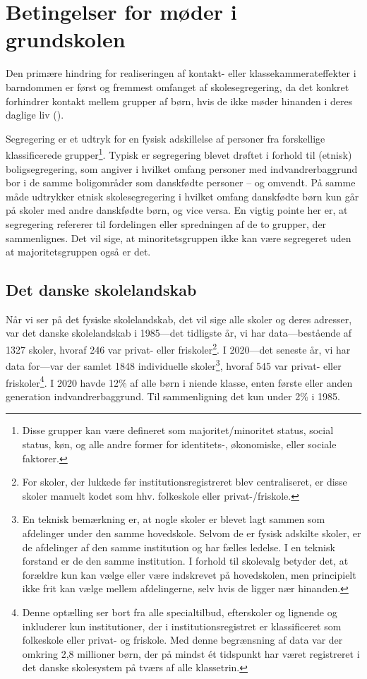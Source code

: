 \documentclass[
]{book}
\begin{document}
\section{Betingelser for møder i grundskolen}\label{betingelser-for-muxf8der-i-grundskolen}

Den primære hindring for realiseringen af kontakt- eller klassekammerateffekter i barndommen er først og fremmest omfanget af skolesegregering, da det konkret forhindrer kontakt mellem grupper af børn, hvis de ikke møder hinanden i deres daglige liv ().

Segregering er et udtryk for en fysisk adskillelse af personer fra forskellige klassificerede grupper\footnote{Disse grupper kan være defineret som majoritet/minoritet status, social status, køn, og alle andre former for identitets-, økonomiske, eller sociale faktorer.}. Typisk er segregering blevet drøftet i forhold til (etnisk) boligsegregering, som angiver i hvilket omfang personer med indvandrerbaggrund bor i de samme boligområder som danskfødte personer -- og omvendt. På samme måde udtrykker etnisk skolesegregering i hvilket omfang danskfødte børn kun går på skoler med andre danskfødte børn, og vice versa. En vigtig pointe her er, at segregering refererer til fordelingen eller spredningen af de to grupper, der sammenlignes. Det vil sige, at minoritetsgruppen ikke kan være segregeret uden at majoritetsgruppen også er det.

\subsection{Det danske skolelandskab}\label{det-danske-skolelandskab}

Når vi ser på det fysiske skolelandskab, det vil sige alle skoler og deres adresser, var det danske skolelandskab i 1985---det tidligste år, vi har data---bestående af 1327 skoler, hvoraf 246 var privat- eller friskoler\footnote{For skoler, der lukkede før institutionsregistreret blev centraliseret, er disse skoler manuelt kodet som hhv. folkeskole eller privat-/friskole.}. I 2020---det seneste år, vi har data for---var der samlet 1848 individuelle skoler\footnote{En teknisk bemærkning er, at nogle skoler er blevet lagt sammen som afdelinger under den samme hovedskole. Selvom de er fysisk adskilte skoler, er de afdelinger af den samme institution og har fælles ledelse. I en teknisk forstand er de den samme institution. I forhold til skolevalg betyder det, at forældre kun kan vælge eller være indskrevet på hovedskolen, men principielt ikke frit kan vælge mellem afdelingerne, selv hvis de ligger nær hinanden.}, hvoraf 545 var privat- eller friskoler\footnote{Denne optælling ser bort fra alle specialtilbud, efterskoler og lignende og inkluderer kun institutioner, der i institutionsregistret er klassificeret som folkeskole eller privat- og friskole. Med denne begrænsning af data var der omkring 2,8 millioner børn, der på mindst ét tidspunkt har været registreret i det danske skolesystem på tværs af alle klassetrin.}. I 2020 havde 12\% af alle børn i niende klasse, enten første eller anden generation indvandrerbaggrund. Til sammenligning det kun under 2\% i 1985.
\end{document}
